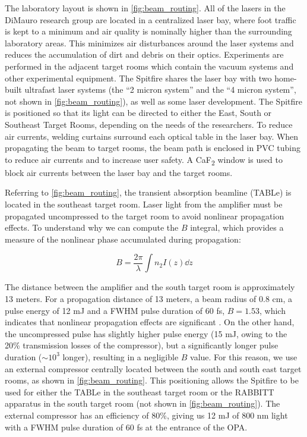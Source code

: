 The laboratory layout is shown in \cref{fig:beam_routing}. All of the lasers in the DiMauro research group are located in a centralized laser bay, where foot traffic is kept to a minimum and air quality is nominally higher than the surrounding laboratory areas. This minimizes air disturbances around the laser systems and reduces the accumulation of dirt and debris on their optics. Experiments are performed in the adjacent target rooms which contain the vacuum systems and other experimental equipment. The Spitfire shares the laser bay with two home-built ultrafast laser systems (the ``2 micron system'' and the ``4 micron system'', not shown in \cref{fig:beam_routing}), as well as some laser development. The Spitfire is positioned so that its light can be directed to either the East, South or Southeast Target Rooms, depending on the needs of the researchers. To reduce air currents, welding curtains surround each optical table in the laser bay. When propagating the beam to target rooms, the beam path is enclosed in PVC tubing to reduce air currents and to increase user safety. A CaF\textsubscript{2} window is used to block air currents between the laser bay and the target rooms.

Referring to \cref{fig:beam_routing}, the transient absorption beamline (TABLe) is located in the southeast target room. Laser light from the amplifier must be propagated uncompressed to the target room to avoid nonlinear propagation effects. To understand why we can compute the $B$ integral, which provides a measure of the nonlinear phase accumulated during propagation: 

\begin{equation}
B = \frac{2 \pi}{\lambda} \int n_2 I(z) \dd{z}
\label{eqn:B-integral}
\end{equation}

The distance between the amplifier and the south target room is approximately 13 meters. For a propagation distance of 13 meters, a beam radius of 0.8 cm, a pulse energy of 12 mJ and a FWHM pulse duration of 60 fs, $B = 1.53$, which indicates that nonlinear propagation effects are significant \cite{zahedpourMeasurementNonlinearRefractive2015}. On the other hand, the uncompressed pulse has slightly higher pulse energy (15 mJ, owing to the 20\% transmission losses of the compressor), but a significantly longer pulse duration ($\sim 10^3$ longer), resulting in a negligible $B$ value. For this reason, we use an external compressor centrally located between the south and south east target rooms, as shown in \cref{fig:beam_routing}. This positioning allows the Spitfire to be used for either the TABLe in the southeast target room or the RABBITT apparatus \cite{chirlaAttosecondPulseGeneration2011,gormanAttosecondProbingElectron2018,kiesewetterDynamicsNearThresholdAttosecond2019} in the south target room (not shown in \cref{fig:beam_routing}). The external compressor has an efficiency of 80\%, giving us 12 mJ of 800 nm light with a FWHM pulse duration of 60 fs at the entrance of the OPA.

